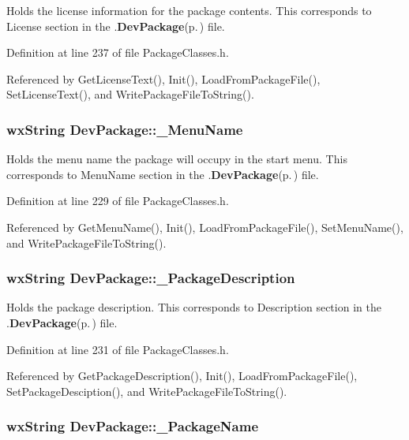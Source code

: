 Holds the license information for the package contents. This corresponds to License section in the .{\bf Dev\-Package}{\rm (p.\,\pageref{class_dev_package})} file. 

Definition at line 237 of file Package\-Classes.h.

Referenced by Get\-License\-Text(), Init(), Load\-From\-Package\-File(), Set\-License\-Text(), and Write\-Package\-File\-To\-String().
\subsubsection{\setlength{\rightskip}{0pt plus 5cm}wx\-String {\bf Dev\-Package::\_\-Menu\-Name}\hspace{0.3cm}{\tt  [private]}}\label{class_dev_package_e5a24bfc54c884c235d12710e0d35211}


Holds the menu name the package will occupy in the start menu. This corresponds to Menu\-Name section in the .{\bf Dev\-Package}{\rm (p.\,\pageref{class_dev_package})} file. 

Definition at line 229 of file Package\-Classes.h.

Referenced by Get\-Menu\-Name(), Init(), Load\-From\-Package\-File(), Set\-Menu\-Name(), and Write\-Package\-File\-To\-String().
\subsubsection{\setlength{\rightskip}{0pt plus 5cm}wx\-String {\bf Dev\-Package::\_\-Package\-Description}\hspace{0.3cm}{\tt  [private]}}\label{class_dev_package_2211a443e8dac5a20714ac0d98b4d47f}


Holds the package description. This corresponds to Description section in the .{\bf Dev\-Package}{\rm (p.\,\pageref{class_dev_package})} file. 

Definition at line 231 of file Package\-Classes.h.

Referenced by Get\-Package\-Description(), Init(), Load\-From\-Package\-File(), Set\-Package\-Desciption(), and Write\-Package\-File\-To\-String().
\subsubsection{\setlength{\rightskip}{0pt plus 5cm}wx\-String {\bf Dev\-Package::\_\-Package\-Name}\hspace{0.3cm}{\tt  [private]}}\label{class_dev_package_2820af4244f97e3d59025c8131d646de}


